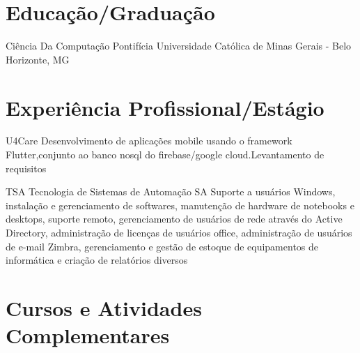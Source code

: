 \documentclass[letterpaper]{moderncurriculum} %
\begin{document}
\section{Educação/Graduação }
\begin{shortlist} %
    {Ciência Da Computação}{}
  {Pontifícia Universidade Católica de Minas Gerais - Belo Horizonte, MG}

\end{shortlist}
\section{Experiência Profissional/Estágio}
\begin{biglist} %
    \space    
	{U4Care}%
	{}%
	{Desenvolvimento de aplicações mobile usando o framework Flutter,conjunto ao banco nosql do firebase/google cloud.Levantamento de requisitos  }
\end{biglist}
\begin{biglist} %
    \space    
	{TSA Tecnologia de Sistemas de Automação SA}%
	{}%
	{Suporte a usuários Windows, instalação e gerenciamento de softwares, manutenção de hardware de notebooks e desktops, suporte remoto, gerenciamento de usuários de rede através do Active Directory, administração de licenças de usuários office, administração de usuários de e-mail Zimbra, gerenciamento e gestão de estoque de equipamentos de informática e criação de relatórios diversos}
\end{biglist}

\section{Cursos e Atividades Complementares}
\begin{shortlist} %

 \end{shortlist}
\end{document}
